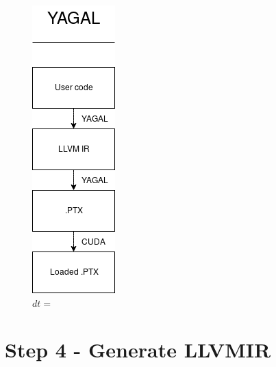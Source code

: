 \begin{figure}[!htb]
\begin{minipage}{0.4\textwidth}
        \includegraphics[width=0.5\linewidth]{chapters/implementation/figs/YAGALLLC.png}
        \caption{$dt =$}
        \label{fig:prob1_6_1}
    \end{minipage}
\end{figure}

\section{Step 4 - Generate LLVMIR}

